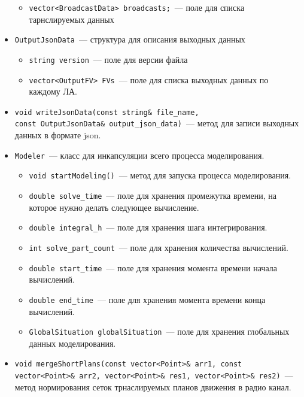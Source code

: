 \documentclass[a4paper,12pt]{article}
\begin{document}
\begin{itemize}
\begin{itemize}
        \item \texttt{vector<BroadcastData> broadcasts;}~--- поле для списка тарнслируемых данных
    \end{itemize}
    \item \texttt{OutputJsonData}~--- структура для описания выходных данных
    \begin{itemize}
        \item \texttt{string version}~--- поле для версии файла
        \item \texttt{vector<OutputFV> FVs}~--- поле для списка выходных данных по каждому ЛА.
    \end{itemize}
    \item \texttt{void writeJsonData(const string\& file\_name,\\ const OutputJsonData\& output\_json\_data)}~--- метод для записи выходных данных в формате json.
     \item \texttt{Modeler}~--- класс для инкапсуляции всего процесса моделирования.
    \begin{itemize}
        \item \texttt{void startModeling()}~---  метод для запуска процесса  моделирования.
        \item \texttt{double solve\_time}~--- поле для хранения промежутка времени, на которое нужно делать следующее вычисление.
        \item \texttt{double integral\_h}~--- поле для хранения шага интегрирования.
        \item \texttt{int solve\_part\_count}~--- поле для хранения количества вычислений.
        \item \texttt{double start\_time}~--- поле для хранения момента времени начала вычислений.
        \item \texttt{double end\_time}~--- поле для хранения момента времени конца вычислений.
        \item \texttt{GlobalSituation globalSituation}~--- поле для хранения глобальных данных моделирования.
    \end{itemize}
    \item \texttt{void mergeShortPlans(const vector<Point>\& arr1, const vector<Point>\& arr2,
	vector<Point>\& res1, vector<Point>\& res2)}~--- метод нормирования сеток трнаслируемых планов движения в радио канал.
\end{itemize}
\end{document}
